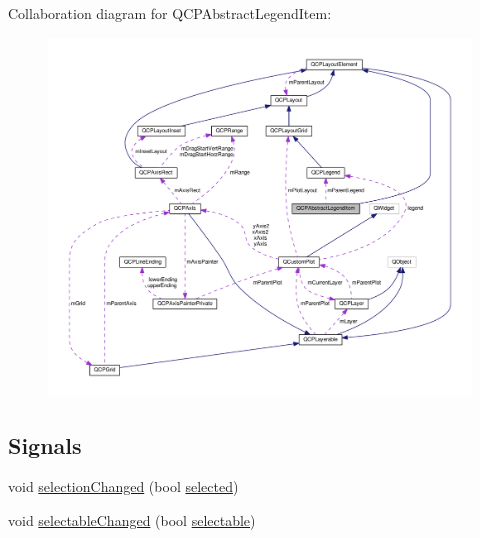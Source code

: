 Collaboration diagram for Q\+C\+P\+Abstract\+Legend\+Item\+:
\nopagebreak
\begin{figure}[H]
\begin{center}
\leavevmode
\includegraphics[width=350pt]{classQCPAbstractLegendItem__coll__graph}
\end{center}
\end{figure}
\subsection*{Signals}
\begin{DoxyCompactItemize}
\item 
void \hyperlink{classQCPAbstractLegendItem_a7cb61fdfbaf69c590bacb8f9e7099d9e}{selection\+Changed} (bool \hyperlink{classQCPAbstractLegendItem_ac776e68e3367704452131c6aa9908bb9}{selected})
\item 
void \hyperlink{classQCPAbstractLegendItem_abc4d779b938cc9235f9196737dbaa6bd}{selectable\+Changed} (bool \hyperlink{classQCPAbstractLegendItem_a0a0205f33f37edae50826c24cb8f1983}{selectable})
\end{DoxyCompactItemize}

